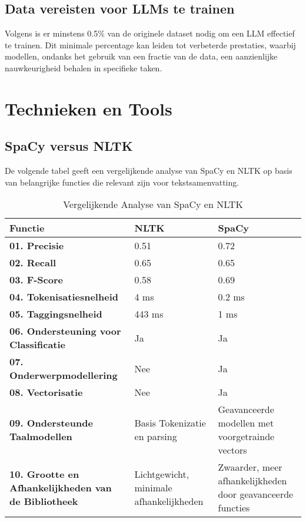 \subsection{Data vereisten voor LLMs te trainen}
\label{sec:DataVereisten}
Volgens \textcite{Scispace} is er minstens 0.5\% van de originele dataset nodig om een LLM effectief te trainen. Dit minimale percentage kan leiden tot verbeterde prestaties, waarbij modellen, ondanks het gebruik van een fractie van de data, een aanzienlijke nauwkeurigheid behalen in specifieke taken.









\section{Technieken en Tools}
\subsection{SpaCy versus NLTK}

De volgende tabel geeft een vergelijkende analyse van SpaCy en NLTK op basis van belangrijke functies die relevant zijn voor tekstsamenvatting.


\begin{table}[H]
    \centering
    \begin{tabular}{|p{4cm}|p{5cm}|p{5cm}|}
        \hline
        \textbf{Functie} & \textbf{NLTK} & \textbf{SpaCy} \\ \hline
        \textbf{01. Precisie} & 0.51 & 0.72 \\ \hline
        \textbf{02. Recall} & 0.65 & 0.65 \\ \hline
        \textbf{03. F-Score} & 0.58 & 0.69 \\ \hline
        \textbf{04. Tokenisatiesnelheid} & 4 ms & 0.2 ms \\ \hline
        \textbf{05. Taggingsnelheid} & 443 ms & 1 ms \\ \hline
        \textbf{06. Ondersteuning voor Classificatie} & Ja & Ja \\ \hline
        \textbf{07. Onderwerpmodellering} & Nee & Ja \\ \hline
        \textbf{08. Vectorisatie} & Nee & Ja \\ \hline
        \textbf{09. Ondersteunde Taalmodellen} & Basis Tokenizatie en parsing & Geavanceerde modellen met voorgetrainde vectors \\ \hline
        \textbf{10. Grootte en Afhankelijkheden van de Bibliotheek} & Lichtgewicht, minimale afhankelijkheden & Zwaarder, meer afhankelijkheden door geavanceerde functies \\ \hline
    \end{tabular}
    \caption{Vergelijkende Analyse van SpaCy en NLTK \autocite{amade2024automatic}}
    \label{tab:Vergelijking Spacy en NLTK}
\end{table}


